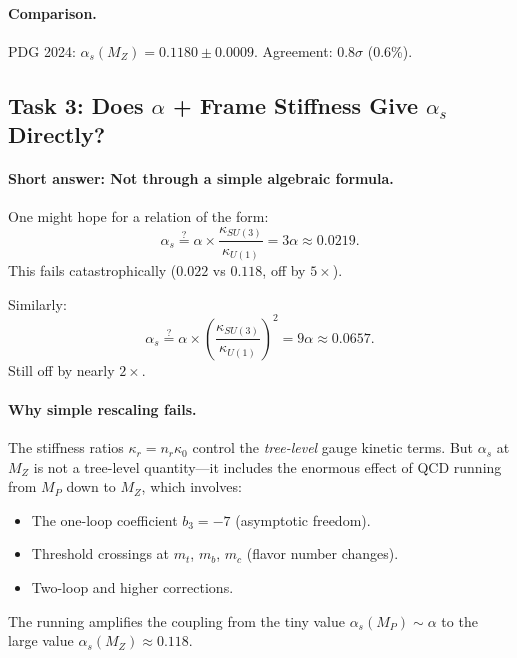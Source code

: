 \paragraph{Comparison.}
PDG 2024: $\alpha_s(M_Z) = 0.1180 \pm 0.0009$. Agreement: $0.8\sigma$ (0.6\%).

\subsection{Task 3: Does $\alpha$ + Frame Stiffness Give $\alpha_s$ Directly?}

\paragraph{Short answer: Not through a simple algebraic formula.}
One might hope for a relation of the form:
\begin{equation}
\alpha_s \stackrel{?}{=} \alpha \times \frac{\kappa_{SU(3)}}{\kappa_{U(1)}} = 3\alpha \approx 0.0219.
\tag{WRONG}
\end{equation}
This fails catastrophically ($0.022$ vs $0.118$, off by $5\times$).

Similarly:
\begin{equation}
\alpha_s \stackrel{?}{=} \alpha \times \left(\frac{\kappa_{SU(3)}}{\kappa_{U(1)}}\right)^2 = 9\alpha \approx 0.0657.
\tag{WRONG}
\end{equation}
Still off by nearly $2\times$.

\paragraph{Why simple rescaling fails.}
The stiffness ratios $\kappa_r = n_r \kappa_0$ control the \emph{tree-level} gauge kinetic terms.
But $\alpha_s$ at $M_Z$ is not a tree-level quantity---it includes the enormous effect of
QCD running from $M_P$ down to $M_Z$, which involves:
\begin{itemize}
\item The one-loop coefficient $b_3 = -7$ (asymptotic freedom).
\item Threshold crossings at $m_t$, $m_b$, $m_c$ (flavor number changes).
\item Two-loop and higher corrections.
\end{itemize}
The running amplifies the coupling from the tiny value $\alpha_s(M_P) \sim \alpha$ to
the large value $\alpha_s(M_Z) \approx 0.118$.


